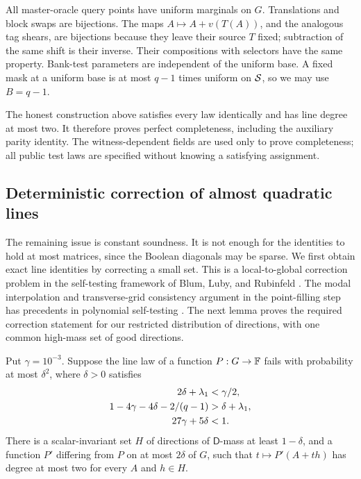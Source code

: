 All master-oracle query points have uniform marginals on $G$.
Translations and block swaps are bijections. The maps
$A\mapsto A+v(T(A))$, and the analogous tag shears, are bijections
because they leave their source $T$ fixed; subtraction of the same
shift is their inverse. Their compositions with selectors have the
same property. Bank-test parameters are independent of the uniform
base. A fixed mask at a uniform base is at most $q-1$ times uniform
on $\mathcal S$, so we may use $B=q-1$.

The honest construction above satisfies every law identically and
has line degree at most two. It therefore proves perfect completeness,
including the auxiliary parity identity. The witness-dependent fields
are used only to prove completeness; all public test laws are specified
without knowing a satisfying assignment.

\subsection{Deterministic correction of almost quadratic lines}

The remaining issue is constant soundness. It is not enough for the
identities to hold at most matrices, since the Boolean diagonals may
be sparse. We first obtain exact line identities by correcting a small
set. This is a local-to-global correction problem in the self-testing
framework of Blum, Luby, and Rubinfeld \cite{BlumLubyRubinfeld1993}.
The modal interpolation and transverse-grid consistency argument in the
point-filling step has precedents in polynomial self-testing
\cite{GemmellEtAl1991,RubinfeldSudan1996}. The next lemma proves the
required correction statement for our restricted distribution of
directions, with one common high-mass set of good directions.

\begin{lemma}\label{lem:quadratic-correction}
Put $\gamma=10^{-3}$. Suppose the line law of a function $P:G\to\mathbb F$
fails with probability at most $\delta^2$, where $\delta>0$ satisfies
\begin{align}
 2\delta+\lambda_1&<\gamma/2,\notag\\
 1-4\gamma-4\delta-2/(q-1)&>\delta+\lambda_1,\label{eq:correction-smallness}\\
 27\gamma+5\delta&<1.\notag
\end{align}
There is a scalar-invariant set $H$ of directions of
$\mathsf D$-mass at least $1-\delta$, and a function $P'$ differing
from $P$ on at most $2\delta$ of $G$, such that
$t\mapsto P'(A+th)$ has degree at most two for every $A$ and $h\in H$.
\end{lemma}


